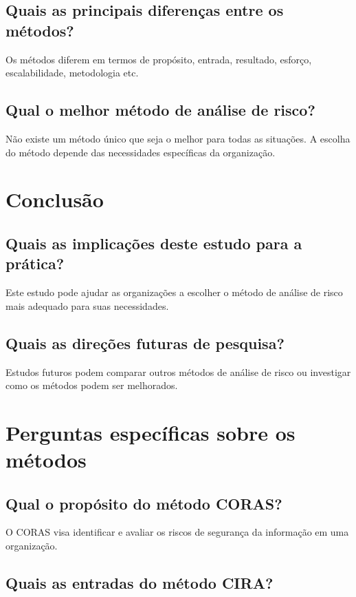 \documentclass[a4paper,12pt]{report}
\begin{document}
\subsection{Quais as principais diferenças entre os métodos?}

Os métodos diferem em termos de propósito, entrada, resultado, esforço, escalabilidade, metodologia etc.

\subsection{Qual o melhor método de análise de risco?}

Não existe um método único que seja o melhor para todas as situações. A escolha do método depende das necessidades específicas da organização.

\section{Conclusão}

\subsection{Quais as implicações deste estudo para a prática?}

Este estudo pode ajudar as organizações a escolher o método de análise de risco mais adequado para suas necessidades.

\subsection{Quais as direções futuras de pesquisa?}

Estudos futuros podem comparar outros métodos de análise de risco ou investigar como os métodos podem ser melhorados.

\section{Perguntas específicas sobre os métodos}

\subsection{Qual o propósito do método CORAS?}

O CORAS visa identificar e avaliar os riscos de segurança da informação em uma organização.

\subsection{Quais as entradas do método CIRA?}
\end{document}
